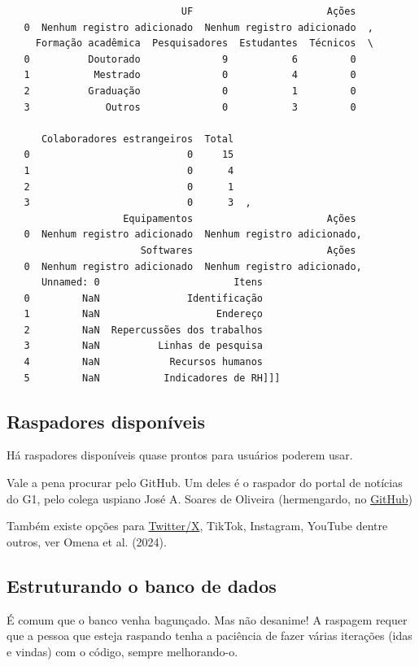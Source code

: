 \documentclass[
  brazilian,
  letterpaper,
  DIV=11,
  numbers=noendperiod]{scrartcl}
\begin{document}
\begin{verbatim}
                              UF                       Ações  
   0  Nenhum registro adicionado  Nenhum registro adicionado  ,
     Formação acadêmica  Pesquisadores  Estudantes  Técnicos  \
   0          Doutorado              9           6         0   
   1           Mestrado              0           4         0   
   2          Graduação              0           1         0   
   3             Outros              0           3         0   
   
      Colaboradores estrangeiros  Total  
   0                           0     15  
   1                           0      4  
   2                           0      1  
   3                           0      3  ,
                    Equipamentos                       Ações
   0  Nenhum registro adicionado  Nenhum registro adicionado,
                       Softwares                       Ações
   0  Nenhum registro adicionado  Nenhum registro adicionado,
      Unnamed: 0                       Itens
   0         NaN               Identificação
   1         NaN                    Endereço
   2         NaN  Repercussões dos trabalhos
   3         NaN          Linhas de pesquisa
   4         NaN            Recursos humanos
   5         NaN           Indicadores de RH]]]
\end{verbatim}

\subsection{Raspadores disponíveis}\label{raspadores-disponuxedveis}

Há raspadores disponíveis quase prontos para usuários poderem usar.

Vale a pena procurar pelo GitHub. Um deles é o raspador do portal de
notícias do G1, pelo colega uspiano José A. Soares de Oliveira
(hermengardo, no
\href{https://github.com/hermengardo/G1_news_scraper/blob/main}{GitHub})

Também existe opções para
\href{https://github.com/vladkens/twscrape}{Twitter/X}, TikTok,
Instagram, YouTube dentre outros, ver Omena et al. (2024).

\subsection{Estruturando o banco de
dados}\label{estruturando-o-banco-de-dados}

É comum que o banco venha bagunçado. Mas não desanime! A raspagem requer
que a pessoa que esteja raspando tenha a paciência de fazer várias
iterações (idas e vindas) com o código, sempre melhorando-o.
\end{document}
